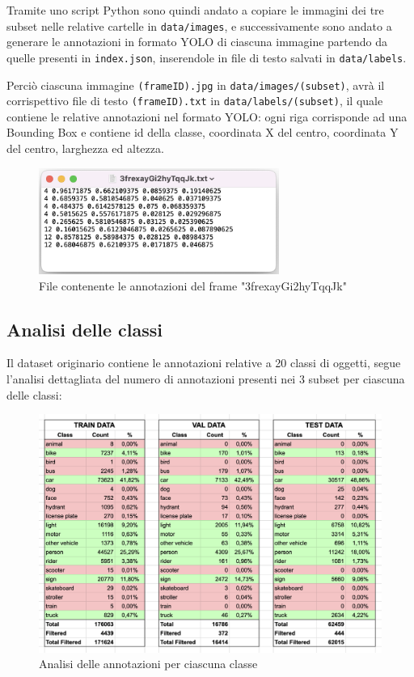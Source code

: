 Tramite uno script Python sono quindi andato a copiare le immagini dei tre subset nelle relative cartelle in \texttt{data/images}, e successivamente sono andato a generare le annotazioni in formato YOLO di ciascuna immagine partendo da quelle presenti in \texttt{index.json}, inserendole in file di testo salvati in \texttt{data/labels}.

Perciò ciascuna immagine \texttt{(frameID).jpg} in \texttt{data/images/(subset)}, avrà il corrispettivo file di testo \texttt{(frameID).txt} in \texttt{data/labels/(subset)}, il quale contiene le relative annotazioni nel formato YOLO: ogni riga corrisponde ad una Bounding Box e contiene id della classe, coordinata X del centro, coordinata Y del centro, larghezza ed altezza.

\vspace{0.5cm}

\begin{figure}[ht]
    \centering
    \includegraphics[width=0.7\textwidth]{files/capitoli/4-sperimentazione-risultati/assets/label-example.png}
    \caption{\label{fig:label-example}File contenente le annotazioni del frame "3frexayGi2hyTqqJk"}
\end{figure}


\subsection{Analisi delle classi}
Il dataset originario contiene le annotazioni relative a 20 classi di oggetti, segue l'analisi dettagliata del numero di annotazioni presenti nei 3 subset per ciascuna delle classi:

\begin{figure}[ht]
    \centering
    \includegraphics[width=1\textwidth]{files/capitoli/4-sperimentazione-risultati/assets/class-counts.png}
    \caption{\label{fig:class-counts}Analisi delle annotazioni per ciascuna classe}
\end{figure}


